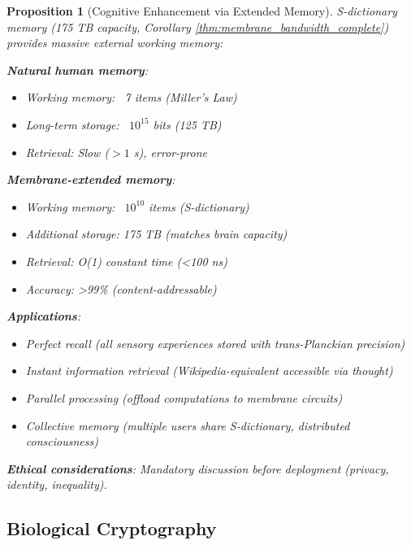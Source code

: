 \documentclass[11pt,a4paper]{article}
\newtheorem{proposition}[theorem]{Proposition}
\theoremstyle{definition}
\theoremstyle{remark}
\begin{document}
\begin{proposition}[Cognitive Enhancement via Extended Memory]
S-dictionary memory (175 TB capacity, Corollary \ref{thm:membrane_bandwidth_complete}) provides massive external working memory:

\textbf{Natural human memory}:
\begin{itemize}
\item Working memory: ~7 items (Miller's Law)
\item Long-term storage: ~$10^{15}$ bits (125 TB)
\item Retrieval: Slow ($>1$ s), error-prone
\end{itemize}

\textbf{Membrane-extended memory}:
\begin{itemize}
\item Working memory: ~$10^{10}$ items (S-dictionary)
\item Additional storage: 175 TB (matches brain capacity)
\item Retrieval: O(1) constant time (<100 ns)
\item Accuracy: >99\% (content-addressable)
\end{itemize}

\textbf{Applications}:
\begin{itemize}
\item Perfect recall (all sensory experiences stored with trans-Planckian precision)
\item Instant information retrieval (Wikipedia-equivalent accessible via thought)
\item Parallel processing (offload computations to membrane circuits)
\item Collective memory (multiple users share S-dictionary, distributed consciousness)
\end{itemize}

\textbf{Ethical considerations}: Mandatory discussion before deployment (privacy, identity, inequality).
\end{proposition}

\subsection{Biological Cryptography}
\end{document}

